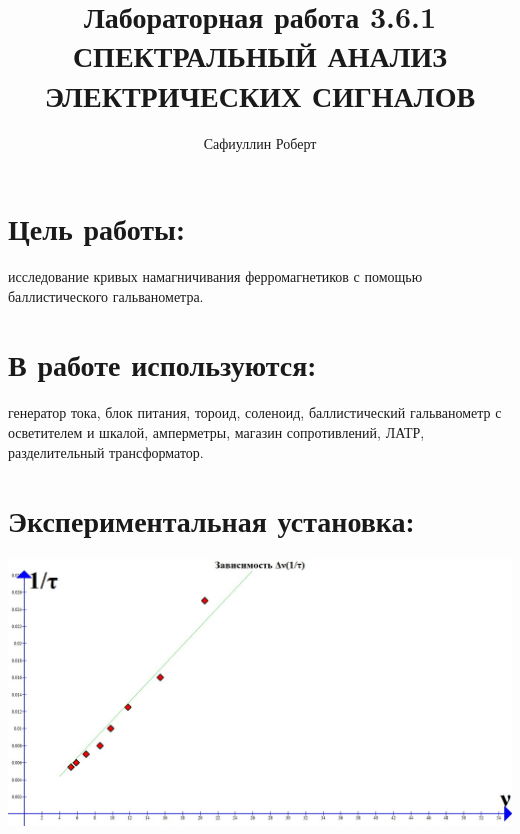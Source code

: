 \documentclass[a4paper,12pt]{article} %
\author{Сафиуллин Роберт	}
\title{Лабораторная работа 3.6.1\\ СПЕКТРАЛЬНЫЙ АНАЛИЗ ЭЛЕКТРИЧЕСКИХ СИГНАЛОВ}
\begin{document}

\maketitle


\newpage
\section{Цель работы:}
исследование кривых намагничивания ферромагнетиков с помощью баллистического гальванометра.
\\
\section{В работе используются:}
генератор тока, блок питания, тороид, соленоид, баллистический гальванометр с осветителем и шкалой, амперметры, магазин сопротивлений, ЛАТР, разделительный трансформатор.

 
\section{Экспериментальная установка:}

 \includegraphics[scale=0.4]{3611}
\end{document}
